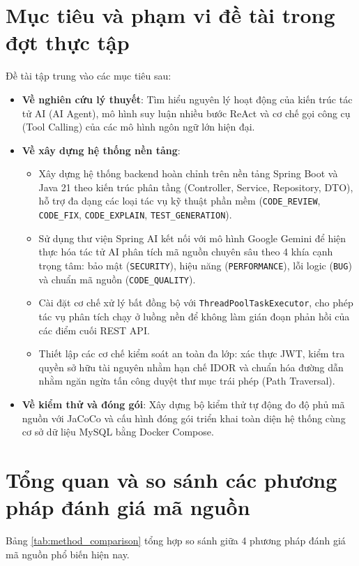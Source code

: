 \documentclass[12pt,a4paper]{report}
\begin{document}
\section{Mục tiêu và phạm vi đề tài trong đợt thực tập}
Đề tài tập trung vào các mục tiêu sau:
\begin{itemize}
    \item \textbf{Về nghiên cứu lý thuyết}: Tìm hiểu nguyên lý hoạt động của kiến trúc tác tử AI (AI Agent), mô hình suy luận nhiều bước ReAct và cơ chế gọi công cụ (Tool Calling) của các mô hình ngôn ngữ lớn hiện đại.
    \item \textbf{Về xây dựng hệ thống nền tảng}:
    \begin{itemize}
        \item Xây dựng hệ thống backend hoàn chỉnh trên nền tảng Spring Boot và Java 21 theo kiến trúc phân tầng (Controller, Service, Repository, DTO), hỗ trợ đa dạng các loại tác vụ kỹ thuật phần mềm (\texttt{CODE\_REVIEW}, \texttt{CODE\_FIX}, \texttt{CODE\_EXPLAIN}, \texttt{TEST\_GENERATION}).
        \item Sử dụng thư viện Spring AI kết nối với mô hình Google Gemini để hiện thực hóa tác tử AI phân tích mã nguồn chuyên sâu theo 4 khía cạnh trọng tâm: bảo mật (\texttt{SECURITY}), hiệu năng (\texttt{PERFORMANCE}), lỗi logic (\texttt{BUG}) và chuẩn mã nguồn (\texttt{CODE\_QUALITY}).
        \item Cài đặt cơ chế xử lý bất đồng bộ với \texttt{ThreadPoolTaskExecutor}, cho phép tác vụ phân tích chạy ở luồng nền để không làm gián đoạn phản hồi của các điểm cuối REST API.
        \item Thiết lập các cơ chế kiểm soát an toàn đa lớp: xác thực JWT, kiểm tra quyền sở hữu tài nguyên nhằm hạn chế IDOR và chuẩn hóa đường dẫn nhằm ngăn ngừa tấn công duyệt thư mục trái phép (Path Traversal).
    \end{itemize}
    \item \textbf{Về kiểm thử và đóng gói}: Xây dựng bộ kiểm thử tự động đo độ phủ mã nguồn với JaCoCo và cấu hình đóng gói triển khai toàn diện hệ thống cùng cơ sở dữ liệu MySQL bằng Docker Compose.
\end{itemize}

\section{Tổng quan và so sánh các phương pháp đánh giá mã nguồn}
Bảng \ref{tab:method_comparison} tổng hợp so sánh giữa 4 phương pháp đánh giá mã nguồn phổ biến hiện nay.
\end{document}
